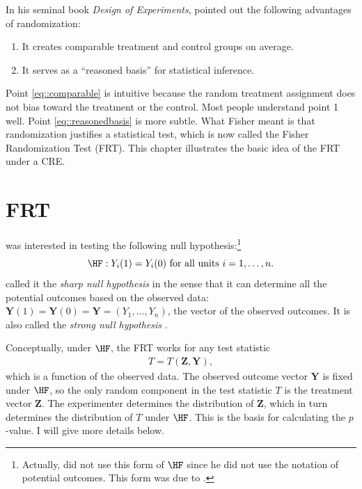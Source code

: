 In his seminal book {\it Design of Experiments}, \citet{Fisher:1935} pointed out the following advantages of randomization:
\begin{enumerate}
[(1)]
\item\label{eq::comparable}
It creates comparable treatment and control groups on average.

\item\label{eq::reasonedbasis}
It serves as a ``reasoned basis'' for statistical inference. 
 \end{enumerate}
 
 
Point \ref{eq::comparable} is intuitive because the random treatment assignment does not bias toward the treatment or the control. Most people understand point 1 well. Point \ref{eq::reasonedbasis} is more subtle. What Fisher meant is that randomization justifies a statistical test, which is now called the Fisher Randomization Test (FRT). This chapter illustrates the basic idea of the FRT  under a CRE.


\section{FRT}
\label{sec::frt-basics}

\citet{Fisher:1935} was interested in testing the following null hypothesis:\footnote{Actually, \citet{Fisher:1935} did not use this form of $\HF$ since he did not use the notation of potential outcomes. This form was due to \citet{Rubin:1980}.}
$$
\HF: Y_i(1) = Y_i(0) \text{ for all units } i=1,\ldots, n.
$$
\citet{Rubin:1980} called it the {\it sharp null hypothesis} in the sense that it can determine all the potential outcomes based on the observed data: $\bm{Y}(1) = \bm{Y}(0) =  \bm{Y} = (Y_1, \ldots, Y_n)$, the vector of the observed outcomes. It is also called the {\it strong null hypothesis} \citep[e.g.,][]{wu2018randomization}. 


Conceptually, under $\HF$, the FRT works for any test statistic 
\begin{eqnarray}\label{eq::teststatistic}
T = T( \bm{Z}, \bm{Y})  ,
\end{eqnarray}
which is a function of the observed data. The observed outcome vector $\bm{Y}$ is fixed under $\HF$, so the only random component in the test statistic $T$ is the treatment vector $\bm{Z}$. The experimenter determines the distribution of $\bm{Z}$, which in turn determines the distribution of $T$ under $\HF$. This is the basis for calculating the $p$-value. I will give more details below. 



